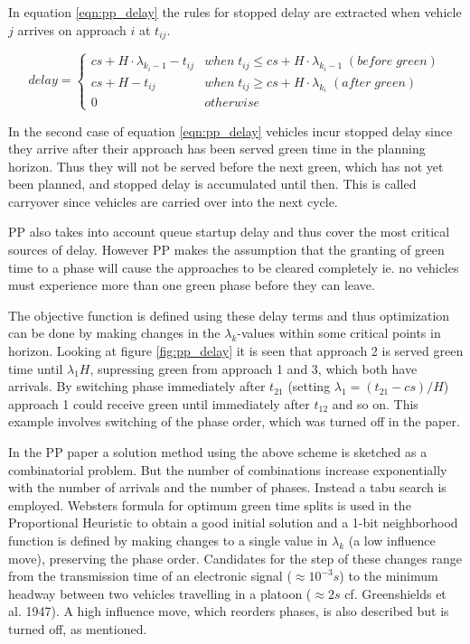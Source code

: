 In equation \ref{eqn:pp_delay} the rules for stopped delay are extracted when vehicle $j$ arrives on approach $i$ at $t_{ij}$.

\begin{equation}
delay = 
\begin{cases}
cs + H \cdot \lambda_{k_i-1} - t_{ij} & when \; t_{ij} \leq cs + H \cdot \lambda_{k_i-1} \; (before\;green)  \\
cs + H - t_{ij} & when \; t_{ij} \geq cs + H \cdot \lambda_{k_i} \; (after\;green)  \\
0 & otherwise
\end{cases}
\label{eqn:pp_delay}
\end{equation}

In the second case of equation \ref{eqn:pp_delay} vehicles incur stopped delay since they arrive after their approach has been served green time in the planning horizon. Thus they will not be served before the next green, which has not yet been planned, and stopped delay is accumulated until then. This is called carryover since vehicles are carried over into the next cycle.

PP also takes into account queue startup delay and thus cover the most critical sources of delay. However PP makes the assumption that the granting of green time to a phase will cause the approaches to be cleared completely ie. no vehicles must experience more than one green phase before they can leave.

The objective function is defined using these delay terms and thus optimization can be done by making changes in the $\lambda_k$-values within some critical points in horizon. Looking at figure \ref{fig:pp_delay} it is seen that approach 2 is served green time until $\lambda_1 H$, supressing green from approach 1 and 3, which both have arrivals. By switching phase immediately after $t_{21}$ (setting $\lambda_1 = (t_{21} - cs)/H$) approach 1 could receive green until immediately after $t_{12}$ and so on. This example involves switching of the phase order, which was turned off in the paper.

In the PP paper a solution method using the above scheme is sketched as a combinatorial problem. But the number of combinations increase exponentially with the number of arrivals and the number of phases. Instead a tabu search is employed. Websters formula for optimum green time splits is used in the Proportional Heuristic to obtain a good initial solution and a 1-bit neighborhood function is defined by making changes to a single value in $\lambda_k$ (a low influence move), preserving the phase order. Candidates for the step of these changes range from the transmission time of an electronic signal ($\approx 10^{-3}s$) to the minimum headway between two vehicles travelling in a platoon ($\approx 2s$ cf. Greenshields et al. 1947).
A high influence move, which reorders phases, is also described but is turned off, as mentioned.

